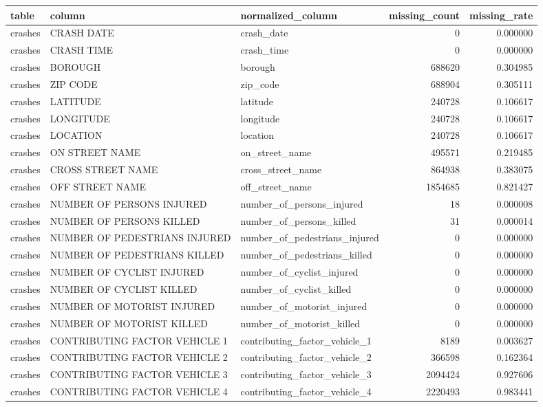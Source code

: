 \begin{tabular}{lllrr}
\toprule
table & column & normalized_column & missing_count & missing_rate \\
\midrule
crashes & CRASH DATE & crash_date & 0 & 0.000000 \\
crashes & CRASH TIME & crash_time & 0 & 0.000000 \\
crashes & BOROUGH & borough & 688620 & 0.304985 \\
crashes & ZIP CODE & zip_code & 688904 & 0.305111 \\
crashes & LATITUDE & latitude & 240728 & 0.106617 \\
crashes & LONGITUDE & longitude & 240728 & 0.106617 \\
crashes & LOCATION & location & 240728 & 0.106617 \\
crashes & ON STREET NAME & on_street_name & 495571 & 0.219485 \\
crashes & CROSS STREET NAME & cross_street_name & 864938 & 0.383075 \\
crashes & OFF STREET NAME & off_street_name & 1854685 & 0.821427 \\
crashes & NUMBER OF PERSONS INJURED & number_of_persons_injured & 18 & 0.000008 \\
crashes & NUMBER OF PERSONS KILLED & number_of_persons_killed & 31 & 0.000014 \\
crashes & NUMBER OF PEDESTRIANS INJURED & number_of_pedestrians_injured & 0 & 0.000000 \\
crashes & NUMBER OF PEDESTRIANS KILLED & number_of_pedestrians_killed & 0 & 0.000000 \\
crashes & NUMBER OF CYCLIST INJURED & number_of_cyclist_injured & 0 & 0.000000 \\
crashes & NUMBER OF CYCLIST KILLED & number_of_cyclist_killed & 0 & 0.000000 \\
crashes & NUMBER OF MOTORIST INJURED & number_of_motorist_injured & 0 & 0.000000 \\
crashes & NUMBER OF MOTORIST KILLED & number_of_motorist_killed & 0 & 0.000000 \\
crashes & CONTRIBUTING FACTOR VEHICLE 1 & contributing_factor_vehicle_1 & 8189 & 0.003627 \\
crashes & CONTRIBUTING FACTOR VEHICLE 2 & contributing_factor_vehicle_2 & 366598 & 0.162364 \\
crashes & CONTRIBUTING FACTOR VEHICLE 3 & contributing_factor_vehicle_3 & 2094424 & 0.927606 \\
crashes & CONTRIBUTING FACTOR VEHICLE 4 & contributing_factor_vehicle_4 & 2220493 & 0.983441 \\

\end{tabular}
